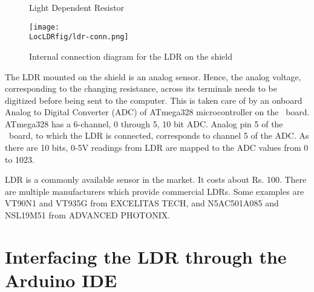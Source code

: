 \begin{figure}
\centering
{} \hfill
{}
\caption{Light Dependent Resistor}
\end{figure}

\begin{figure}
\centering
\texttt{[image: \\LocLDRfig/ldr-conn.png]}
\caption{Internal connection diagram for the LDR on the shield}
\label{fig:ldrconn}
\end{figure}

The LDR mounted on the shield is an analog sensor. Hence, the analog voltage, corresponding to the changing resistance, across its terminals needs to be digitized before being sent to the computer. This is taken care of by an onboard Analog to Digital Converter (ADC) of ATmega328 microcontroller on the \arduino\
board. ATmega328 has a 6-channel, 0 through 5, 10 bit ADC. Analog pin
5 of the \arduino\ board, to which the LDR is connected, corresponds
to channel 5 of the ADC.  As there are 10 bits, 0-5V readings from LDR
are mapped to the ADC values from 0 to 1023. 

LDR is a commonly available sensor in the market. It costs about
Rs. 100. There are multiple manufacturers which provide commercial
LDRs.  Some examples are VT90N1 and VT935G from EXCELITAS TECH, and
N5AC501A085 and NSL19M51 from ADVANCED PHOTONIX. 

\section{Interfacing the LDR through the Arduino IDE}
